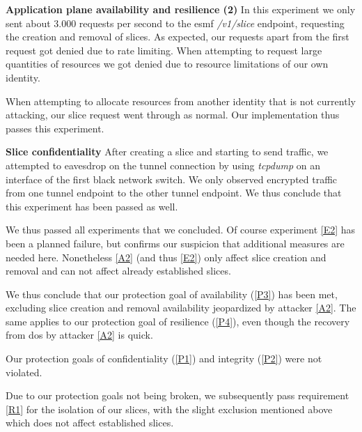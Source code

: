 \begin{description}[style=multiline, labelwidth=0.7cm]
   \item[\ref{E3}] \textbf{Application plane availability and resilience (2)} In this experiment we only sent about 3.000 requests per second to the \acrshort{esmf} \textit{/v1/slice} endpoint, requesting the creation and removal of slices. As expected, our requests apart from the first request got denied due to rate limiting. When attempting to request large quantities of resources we got denied due to resource limitations of our own identity.

   When attempting to allocate resources from another identity that is not currently attacking, our slice request went through as normal. Our implementation thus passes this experiment.

   \item[\ref{E4}] \textbf{Slice confidentiality} After creating a slice and starting to send traffic, we attempted to eavesdrop on the tunnel connection by using \textit{tcpdump} on an interface of the first black network switch. We only observed encrypted traffic from one tunnel endpoint to the other tunnel endpoint. We thus conclude that this experiment has been passed as well.
\end{description}

We thus passed all experiments that we concluded. Of course experiment \ref{E2} has been a planned failure, but confirms our suspicion that additional measures are needed here. Nonetheless \ref{A2} (and thus \ref{E2}) only affect slice creation and removal and can not affect already established slices.

We thus conclude that our protection goal of availability (\ref{P3}) has been met, excluding slice creation and removal availability jeopardized by attacker \ref{A2}. The same applies to our protection goal of resilience (\ref{P4}), even though the recovery from \acrshort{dos} by attacker \ref{A2} is quick.

Our protection goals of confidentiality (\ref{P1}) and integrity (\ref{P2}) were not violated.

Due to our protection goals not being broken, we subsequently pass requirement \ref{R1} for the isolation of our slices, with the slight exclusion mentioned above which does not affect established slices.

